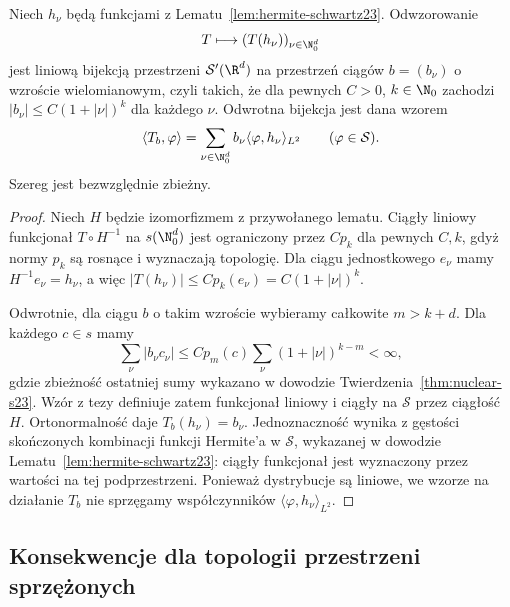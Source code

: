 \begin{wniosek}
\label{cor:dt-hermite-tempered}
Niech $h_\nu$ będą funkcjami z Lematu~\ref{lem:hermite-schwartz23}.
Odwzorowanie
\[
 T\longmapsto (T(h_\nu))_{\nu\in\N_0^d}
\]
jest liniową bijekcją przestrzeni $\mathcal S'(\R^d)$
na przestrzeń ciągów $b=(b_\nu)$ o wzroście
wielomianowym, czyli takich, że dla pewnych
$C>0$, $k\in\N_0$ zachodzi
$|b_\nu|\le C(1+|\nu|)^k$ dla każdego $\nu$.
Odwrotna bijekcja jest dana wzorem
\[
 \langle T_b,\varphi\rangle
 =\sum_{\nu\in\N_0^d}b_\nu\langle\varphi,h_\nu\rangle_{L^2}
 \qquad(\varphi\in\mathcal S).
\]
Szereg jest bezwzględnie zbieżny.
\end{wniosek}
\begin{proof}
Niech $H$ będzie izomorfizmem z przywołanego lematu.
Ciągły liniowy funkcjonał $T\circ H^{-1}$ na
$s(\N_0^d)$ jest ograniczony przez $Cp_k$ dla
pewnych $C,k$, gdyż normy $p_k$ są rosnące i
wyznaczają topologię. Dla ciągu jednostkowego $e_\nu$
mamy $H^{-1}e_\nu=h_\nu$, a więc
$|T(h_\nu)|\le Cp_k(e_\nu)=C(1+|\nu|)^k$.

Odwrotnie, dla ciągu $b$ o takim wzroście
wybieramy całkowite $m>k+d$. Dla każdego $c\in s$
mamy
\[
 \sum_\nu |b_\nu c_\nu|
 \le Cp_m(c)\sum_\nu(1+|\nu|)^{k-m}<\infty,
\]
gdzie zbieżność ostatniej sumy wykazano w dowodzie
Twierdzenia~\ref{thm:nuclear-s23}.
Wzór z tezy definiuje zatem funkcjonał liniowy
i ciągły na $\mathcal S$ przez ciągłość $H$.
Ortonormalność daje $T_b(h_\nu)=b_\nu$.
Jednoznaczność wynika z gęstości skończonych
kombinacji funkcji Hermite'a w $\mathcal S$,
wykazanej w dowodzie Lematu~\ref{lem:hermite-schwartz23}:
ciągły funkcjonał jest wyznaczony przez wartości
na tej podprzestrzeni. Ponieważ dystrybucje są
liniowe, we wzorze na działanie $T_b$ nie sprzęgamy
współczynników $\langle\varphi,h_\nu\rangle_{L^2}$.
\end{proof}

\subsection{Konsekwencje dla topologii przestrzeni sprzężonych}

